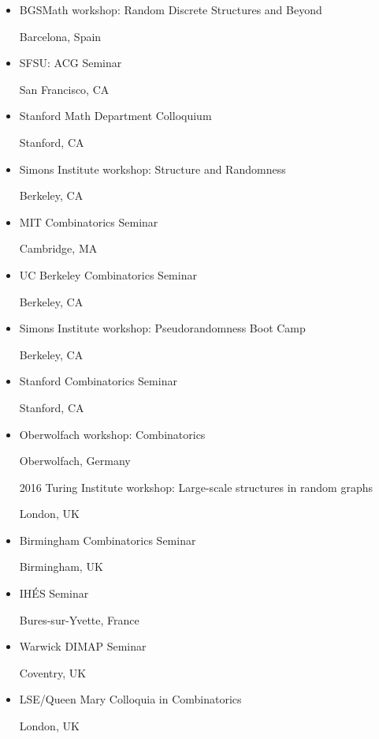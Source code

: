 \documentclass[11pt]{amsart}
\newcommand{\rightloc}[1]{\hfill {\raggedright #1}}
\begin{document}
\begin{itemize}[leftmargin=.4in,itemsep=5pt,topsep=0pt,label={}]
\item BGSMath workshop: Random Discrete Structures and Beyond \rightloc{Barcelona, Spain}

\item SFSU: ACG Seminar \rightloc{San Francisco, CA}

\item Stanford Math Department Colloquium \rightloc{Stanford, CA}

\item Simons Institute workshop: Structure and Randomness \rightloc{Berkeley, CA}

\item MIT Combinatorics Seminar \rightloc{Cambridge, MA}

\item UC Berkeley Combinatorics Seminar
\rightloc{Berkeley, CA}

\item Simons Institute workshop: Pseudorandomness Boot Camp \rightloc{Berkeley, CA}

\item Stanford Combinatorics Seminar
\rightloc{Stanford, CA}

\item Oberwolfach workshop: Combinatorics \rightloc{Oberwolfach, Germany}

\item[2016] Turing Institute workshop: Large-scale structures in random graphs \rightloc{London, UK}

\item Birmingham Combinatorics Seminar \rightloc{Birmingham, UK}

\item IH\'ES Seminar \rightloc{Bures-sur-Yvette, France}

\item Warwick DIMAP Seminar \rightloc{Coventry, UK}


\item LSE/Queen Mary Colloquia in Combinatorics \rightloc{London, UK}


\end{itemize}
\end{document}
